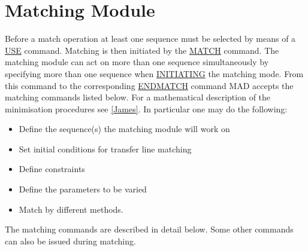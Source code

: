 
\chapter{Matching Module}

Before a match operation at least one sequence must be selected by means
of a \href{../control/general.html#use}{USE} command. Matching is then
initiated by the \href{match_main.html}{MATCH} command. The matching
module can act on more than one sequence simultaneously by  specifying
more than one sequence when  \href{match_main.html#match}{INITIATING}
the matching mode.  From this command to the corresponding
\href{match_main.html#endmatch}{ENDMATCH} command MAD accepts the
matching commands listed below. For a mathematical description of the
minimisation procedures see \href{bibliography.html#minuit}{[James]}. In
particular one may do the following: 
\begin{itemize}
	\item Define the sequence(s) the matching module will work on 
	\item Set initial conditions for transfer line matching 
	\item Define constraints 
	\item Define the parameters to be varied 
	\item Match by different methods. 
\end{itemize}

The matching commands are described in detail below. Some other commands
can also be issued during matching.  

